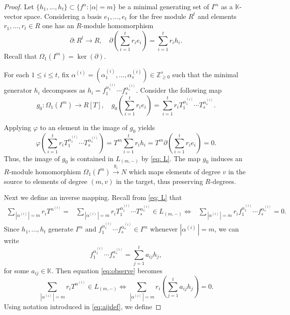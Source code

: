 \documentclass[10pt,a4paper]{amsart}
\begin{document}
\begin{proof}
    Let \(\{h_1, ..., h_t\}\subset\{ f^\alpha:|\alpha|=m \}\) be a minimal generating set of \(I^m\) as a \(\mathbb{K}\)-vector space. Considering a basis $e_1, \ldots, e_t$ for the free module $R^t$ and elements $r_1,\ldots, r_t\in R$ one has an $R$-module homomorphism
    \[\partial:R^t\rightarrow R 
    , \quad \partial \left(\sum_{i=1}^t r_ie_i\right)= \sum_{i=1}^t  r_ih_i.
    \] 
    Recall that \(\Omega_1(I^m)=\ker(\partial)\).

    

    For each $1\leq i\leq t$, fix  $\alpha^{(i)}=(\alpha^{(i)}_1, \ldots, \alpha^{(i)}_s)\in \mathbb{Z}_{\geq 0}^s$ such that the minimal generator $h_i$ decomposes as \(h_i=f_1^{\alpha^{(i)}_1}\cdots f_s^{\alpha^{(i)}_s}\).
    Consider the following map
    \begin{equation}\label{eq: defg0}
    g_0:\Omega_1(I^m)\rightarrow R[T], \quad g_0\left(\sum_{i=1}^t r_ie_i\right)=\sum_{i=1}^t r_iT_1^{\alpha_1^{(i)}}\cdots T_s^{\alpha_s^{(i)}}.
    \end{equation}
    
    Applying \(\varphi\) to an element in the image of $g_0$ yields 
    \begin{equation*}
        \varphi\left(\sum_{i=1}^t r_iT_1^{\alpha_1^{(i)}}\cdots T_s^{\alpha_s^{(i)}}\right)
        = T^m\sum_{i=1}^t r_ih_i
        = T^m \partial\left(\sum_{i=1}^t r_ie_i\right)= 0.
    \end{equation*}
    Thus, the image of $g_0$ is contained in $L_{(m, -)}$ by \eqref{eq: L}. 
    The map \(g_0\) induces an $R$-module homomorphism \(\Omega_1(I^m)\xrightarrow{g_1} N\) which maps elements of degree $v$ in the source to elements of degree $(m,v)$ in the target, thus preserving $R$-degrees.

 Next we define an inverse mapping. 
  Recall from \eqref{eq: L} that
    \begin{align}\label{eq:observe}
\sum_{\,|\alpha^{(i)}\,|=m} r_iT^{\alpha^{(i)}} = &\sum_{\,|\alpha^{(i)}\,|=m} r_iT_1^{\alpha_1^{(i)}}\cdots T_s^{\alpha_s^{(i)}}\in L_{(m,-)} 
        \iff& \sum_{\,|\alpha^{(i)}\,|=m} r_i f_1^{\alpha_1^{(i)}}\cdots f_s^{\alpha_s^{(i)}}=0.
    \end{align}
Since \(h_1,...,h_t\) generate  \(I^m\) and \(f_1^{\alpha_1^{(i)}}\cdots f_s^{\alpha_s^{(i)}}\in I^m\) whenever $|\alpha^{(i)}\,|=m$,  we can write   
\begin{equation}\label{eq:aijdef}
f_1^{\alpha_1^{(i)}}\cdots f_s^{\alpha_s^{(i)}}=\sum_{j=1}^t a_{ij}h_{j},
\end{equation}
for some \(a_{ij}\in\mathbb{K}\). 
    Then equation \eqref{eq:observe} becomes
    \begin{equation}\label{eq: becomes}
        \sum_{\,|\alpha^{(i)}\,|=m} r_iT^{\alpha^{(i)}} \in L_{(m,-)}\iff \sum_{\,|\alpha^{(i)}\,|=m} r_i \left(\sum_{j=1}^ta_{ij}h_{j}\right)=0.
        \end{equation}
    Using notation introduced in \eqref{eq:aijdef}, we define
  

\end{proof}
\end{document}
